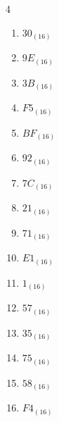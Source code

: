 \begin{multicols}{4}
\begin{enumerate}
  \item $30_{(16)}$

        \phantom{$=48$}

  \item $9E_{(16)}$

        \phantom{$=158$}

  \item $3B_{(16)}$

        \phantom{$=59$}

  \item $F5_{(16)}$

        \phantom{$=245$}

  \item $BF_{(16)}$

        \phantom{$=191$}

\columnbreak %

  \item $92_{(16)}$

        \phantom{$=146$}

  \item $7C_{(16)}$

        \phantom{$=124$}

  \item $21_{(16)}$

        \phantom{$=33$}

  \item $71_{(16)}$

        \phantom{$=113$}

  \item $E1_{(16)}$

        \phantom{$=225$}

  \item $1_{(16)}$

        \phantom{$=1$}

  \item $57_{(16)}$

        \phantom{$=87$}

  \item $35_{(16)}$

        \phantom{$=53$}

  \item $75_{(16)}$

        \phantom{$=117$}

  \item $58_{(16)}$

        \phantom{$=88$}

  \item $F4_{(16)}$


\end{enumerate}
\end{multicols}
